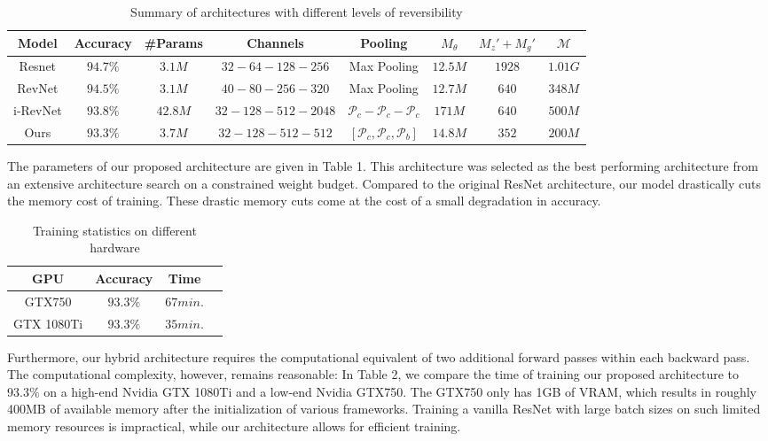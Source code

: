 \documentclass[twocolumn]{bmcart}
\begin{document}
\begin{table*}[t]
\begin{tabular}{ c c c c c c c c}
Model     & Accuracy & \#Params & Channels & Pooling  & $M_{\theta}$ & $M_{z}'+M_{g}'$ & $\mathcal{M} $ \\
\hline
Resnet    & $94.7\%$   & $3.1M$   &  $32 - 64 - 128  - 256$       & Max Pooling      				           &  $12.5M$   &  $1928$  & $1.01G$  \\
RevNet    & $94.5\%$   & $3.1M$   &  $40 - 80 - 256  - 320$       & Max Pooling      				           &  $12.7M$   &  $640$   & $348M$   \\
i-RevNet  & $93.8\%$   & $42.8M$  &  $32 - 128 - 512 - 2048$      & $\mathcal{P}_c - \mathcal{P}_c - \mathcal{P}_c$          &  $171M$    &  $640$   & $500M$   \\
Ours      & $93.3\%$   & $3.7M$   &  $32 - 128 - 512 - 512$       & $[\mathcal{P}_c, \mathcal{P}_c, \mathcal{P}_b]$          &  $14.8M$   &  $352$   & $200M$   \\
\hline
\end{tabular}
\begin{center}
\caption{Summary of architectures with different levels of reversibility}
\end{center}
\end{table*}

The parameters of our proposed architecture are given in Table 1.
This architecture was selected as the best performing architecture
from an extensive architecture search on a constrained weight budget.
Compared to the original ResNet architecture, our model drastically cuts the memory cost of training.
These drastic memory cuts come at the cost of a small degradation in accuracy.

\begin{table}[h]
\centering
\begin{tabular}{ c c c c}
 GPU & Accuracy  & Time \\
\hline
GTX750     & $93.3\%$  & $67 min.$    \\
GTX 1080Ti & $93.3\%$  & $35 min.$  \\
\hline
\end{tabular}
\caption{Training statistics on different hardware}
\end{table}

Furthermore, our hybrid architecture requires the computational equivalent of two additional forward passes within each backward pass.
The computational complexity, however, remains reasonable:
In Table 2, we compare the time of training our proposed architecture to 93.3\% on a high-end Nvidia GTX 1080Ti and a low-end
Nvidia GTX750.
The GTX750 only has 1GB of VRAM, which results in roughly 400MB of available memory after the initialization of various frameworks.
Training a vanilla ResNet with large batch sizes on such limited memory resources is impractical, while our architecture allows for efficient training.
\end{document}
